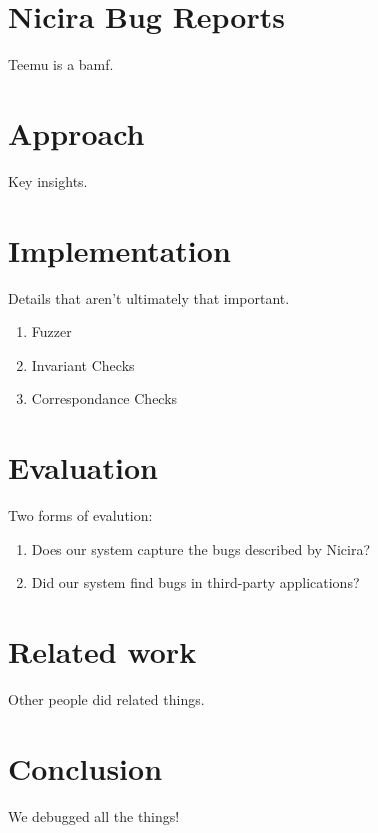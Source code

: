 \documentclass{sig-alternate-10pt}
\begin{document}
\section{Nicira Bug Reports}

Teemu is a bamf.

\section{Approach}

Key insights.

\section{Implementation}

Details that aren't ultimately that important.

\begin{enumerate}
\item Fuzzer
\item Invariant Checks
\item Correspondance Checks
\end{enumerate}

\section{Evaluation}

Two forms of evalution:

\begin{enumerate}
\item Does our system capture the bugs described by Nicira?
\item Did our system find bugs in third-party applications?
\end{enumerate}

\section{Related work}

Other people did related things.

\section{Conclusion}

We debugged all the things!

\scriptsize



%
\end{document}
